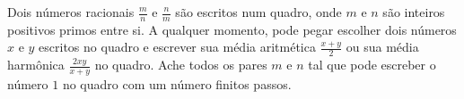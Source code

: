 Dois números racionais $\tfrac{m}{n}$ e $\tfrac{n}{m}$ são escritos num quadro, onde $m$ e $n$ são inteiros positivos primos entre si. A qualquer momento,  pode pegar escolher dois números $x$ e $y$ escritos no quadro e escrever sua média aritmética $\tfrac{x+y}{2}$ ou sua média harmônica $\tfrac{2xy}{x+y}$ no quadro. Ache todos os pares $m$ e $n$ tal que  pode escreber o número $1$ no quadro com um número finitos passos.
